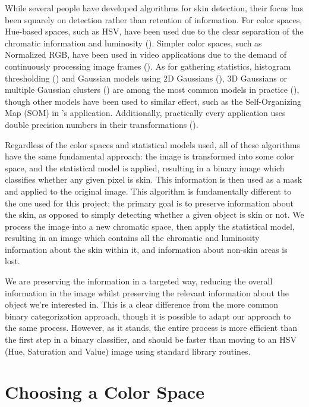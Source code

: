 While several people have developed algorithms for skin detection, their focus has been squarely on detection rather than retention of information. For color spaces, Hue-based spaces, such as HSV, have been used due to the clear separation of the chromatic information and luminosity (\cite{Zarit1999a,Sigal2000a}). Simpler color spaces, such as Normalized RGB, have been used in video applications due to the demand of continuously processing image frames (\cite{Soriano2000a}). As for gathering statistics, histogram thresholding (\cite{Soriano2000a,Sigal2000a}) and Gaussian models using 2D Gaussians (\cite{Terrillon1999a}), 3D Gaussians or multiple Gaussian clusters (\cite{Vezhnevets2003}) are among the most common models in practice (\cite{Shin2002a}), though other models have been used to similar effect, such as the Self-Organizing Map (SOM) in \cite{Brown2001a}'s application. Additionally, practically every application uses double precision numbers in their transformations (\cite{Shin2002a,Vezhnevets2003,Terrillon1999a}).

Regardless of the color spaces and statistical models used, all of these algorithms have the same fundamental approach: the image is transformed into some color space, and the statistical model is applied, resulting in a binary image which classifies whether any given pixel is skin. This information is then used as a mask and applied to the original image. This algorithm is fundamentally different to the one used for this project; the primary goal is to preserve information about the skin, as opposed to simply detecting whether a given object is skin or not. We process the image into a new chromatic space, then apply the statistical model, resulting in an image which contains all the chromatic and luminosity information about the skin within it, and information about non-skin areas is lost. 

We are preserving the information in a targeted way, reducing the overall information in the image whilst preserving the relevant information about the object we're interested in. This is a clear difference from the more common binary categorization approach, though it is possible to adapt our approach to the same process. However, as it stands, the entire process is more efficient than the first step in a binary classifier, and should be faster than moving to an HSV (Hue, Saturation and Value) image using standard library routines.


\section{Choosing a Color Space}

